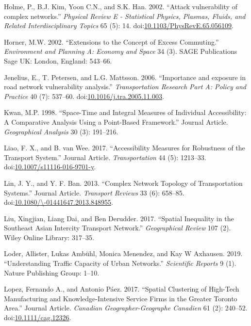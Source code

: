 \documentclass[]{elsarticle} %
\begin{document}
\hypertarget{ref-Holme2002}{}
Holme, P., B.J. Kim, Yoon C.N., and S.K. Han. 2002. ``Attack
vulnerability of complex networks.'' \emph{Physical Review E -
Statistical Physics, Plasmas, Fluids, and Related Interdisciplinary
Topics} 65 (5): 14.
doi:\href{https://doi.org/10.1103/PhysRevE.65.056109}{10.1103/PhysRevE.65.056109}.

\hypertarget{ref-Horner2002extensions}{}
Horner, M.W. 2002. ``Extensions to the Concept of Excess Commuting.''
\emph{Environment and Planning A: Economy and Space} 34 (3). SAGE
Publications Sage UK: London, England: 543--66.

\hypertarget{ref-Jenelius2006}{}
Jenelius, E., T. Petersen, and L.G. Mattsson. 2006. ``Importance and
exposure in road network vulnerability analysis.'' \emph{Transportation
Research Part A: Policy and Practice} 40 (7): 537--60.
doi:\href{https://doi.org/10.1016/j.tra.2005.11.003}{10.1016/j.tra.2005.11.003}.

\hypertarget{ref-Kwan1998}{}
Kwan, M.P. 1998. ``Space-Time and Integral Measures of Individual
Accessibility: A Comparative Analysis Using a Point-Based Framework.''
Journal Article. \emph{Geographical Analysis} 30 (3): 191--216.

\hypertarget{ref-Liao2017accessibility}{}
Liao, F. X., and B. van Wee. 2017. ``Accessibility Measures for
Robustness of the Transport System.'' Journal Article.
\emph{Transportation} 44 (5): 1213--33.
doi:\href{https://doi.org/10.1007/s11116-016-9701-y}{10.1007/s11116-016-9701-y}.

\hypertarget{ref-Lin2013complex}{}
Lin, J. Y., and Y. F. Ban. 2013. ``Complex Network Topology of
Transportation Systems.'' Journal Article. \emph{Transport Reviews} 33
(6): 658--85.
doi:\href{https://doi.org/10.1080//-01441647.2013.848955}{10.1080/\textbackslash{}-01441647.2013.848955}.

\hypertarget{ref-liu2017spatial}{}
Liu, Xingjian, Liang Dai, and Ben Derudder. 2017. ``Spatial Inequality
in the Southeast Asian Intercity Transport Network.'' \emph{Geographical
Review} 107 (2). Wiley Online Library: 317--35.

\hypertarget{ref-loder2019understanding}{}
Loder, Allister, Lukas Ambühl, Monica Menendez, and Kay W Axhausen.
2019. ``Understanding Traffic Capacity of Urban Networks.''
\emph{Scientific Reports} 9 (1). Nature Publishing Group: 1--10.

\hypertarget{ref-Lopez2017spatial}{}
Lopez, Fernando A., and Antonio Páez. 2017. ``Spatial Clustering of
High-Tech Manufacturing and Knowledge-Intensive Service Firms in the
Greater Toronto Area.'' Journal Article. \emph{Canadian
Geographer-Geographe Canadien} 61 (2): 240--52.
doi:\href{https://doi.org/10.1111/cag.12326}{10.1111/cag.12326}.
\end{document}
